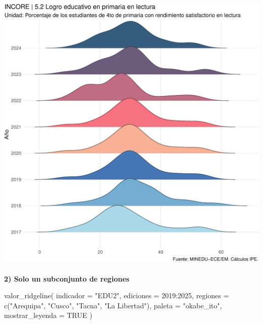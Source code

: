 \documentclass[
  11pt,
  letterpaper,
  DIV=11,
  numbers=noendperiod]{scrartcl}
\makeatletter
\let\oldparagraph\paragraph
\renewcommand{\paragraph}{
    \@ifstar
      \xxxParagraphStar
      \xxxParagraphNoStar
  }
\newcommand{\xxxParagraphStar}[1]{\oldparagraph*{#1}\mbox{}}
\newcommand{\xxxParagraphNoStar}[1]{\oldparagraph{#1}\mbox{}}
\newenvironment{Shaded}{\begin{snugshade}}{\end{snugshade}}
\newcommand{\AttributeTok}[1]{\textcolor[rgb]{0.40,0.45,0.13}{#1}}
\newcommand{\ConstantTok}[1]{\textcolor[rgb]{0.56,0.35,0.01}{#1}}
\newcommand{\DecValTok}[1]{\textcolor[rgb]{0.68,0.00,0.00}{#1}}
\newcommand{\FunctionTok}[1]{\textcolor[rgb]{0.28,0.35,0.67}{#1}}
\newcommand{\NormalTok}[1]{\textcolor[rgb]{0.00,0.23,0.31}{#1}}
\newcommand{\SpecialCharTok}[1]{\textcolor[rgb]{0.37,0.37,0.37}{#1}}
\newcommand{\StringTok}[1]{\textcolor[rgb]{0.13,0.47,0.30}{#1}}
\makeatother
\begin{document}
\includegraphics{Manual_files/figure-pdf/unnamed-chunk-103-1.pdf}

\paragraph{\texorpdfstring{\textbf{2) Solo un subconjunto de
regiones}}{2) Solo un subconjunto de regiones}}\label{solo-un-subconjunto-de-regiones}

\begin{Shaded}
\begin{Highlighting}[]
\FunctionTok{valor\_ridgeline}\NormalTok{(}
  \AttributeTok{indicador =} \StringTok{"EDU2"}\NormalTok{,}
  \AttributeTok{ediciones =} \DecValTok{2019}\SpecialCharTok{:}\DecValTok{2025}\NormalTok{,}
  \AttributeTok{regiones  =} \FunctionTok{c}\NormalTok{(}\StringTok{"Arequipa"}\NormalTok{, }\StringTok{"Cusco"}\NormalTok{, }\StringTok{"Tacna"}\NormalTok{, }\StringTok{"La Libertad"}\NormalTok{),}
  \AttributeTok{paleta    =} \StringTok{"okabe\_ito"}\NormalTok{,}
  \AttributeTok{mostrar\_leyenda =} \ConstantTok{TRUE}
\NormalTok{)}
\end{Highlighting}
\end{Shaded}
\end{document}

